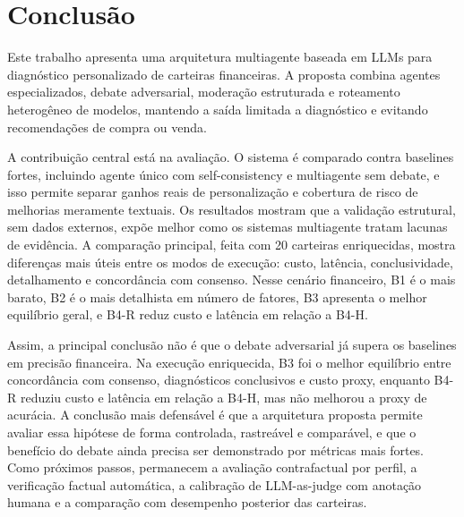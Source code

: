 \section{Conclusão}

Este trabalho apresenta uma arquitetura multiagente baseada em LLMs para
diagnóstico personalizado de carteiras financeiras. A proposta combina
agentes especializados, debate adversarial, moderação estruturada e
roteamento heterogêneo de modelos, mantendo a saída limitada a
diagnóstico e evitando recomendações de compra ou venda.

A contribuição central está na avaliação. O sistema é comparado contra
baselines fortes, incluindo agente único com self-consistency e
multiagente sem debate, e isso permite separar ganhos reais de
personalização e cobertura de risco de melhorias meramente textuais.
Os resultados mostram que a validação estrutural, sem dados externos,
expõe melhor como os sistemas multiagente tratam lacunas de evidência. A
comparação principal, feita com 20 carteiras enriquecidas, mostra diferenças
mais úteis entre os modos de execução: custo, latência, conclusividade,
detalhamento e concordância com consenso. Nesse cenário financeiro, B1 é o
mais barato, B2 é o mais detalhista em número de fatores, B3 apresenta o
melhor equilíbrio geral, e B4-R reduz custo e latência em relação a B4-H.

Assim, a principal conclusão não é que o debate adversarial já supera os
baselines em precisão financeira. Na execução enriquecida, B3 foi o melhor
equilíbrio entre concordância com consenso, diagnósticos conclusivos e custo
proxy, enquanto B4-R reduziu custo e latência em relação a B4-H, mas não
melhorou a proxy de acurácia. A conclusão mais defensável é que a
arquitetura proposta permite avaliar essa hipótese de forma controlada,
rastreável e comparável, e que o benefício do debate ainda precisa ser
demonstrado por métricas mais fortes. Como próximos passos, permanecem a
avaliação contrafactual por perfil, a verificação factual automática, a
calibração de LLM-as-judge com anotação humana e a comparação com desempenho
posterior das carteiras.

